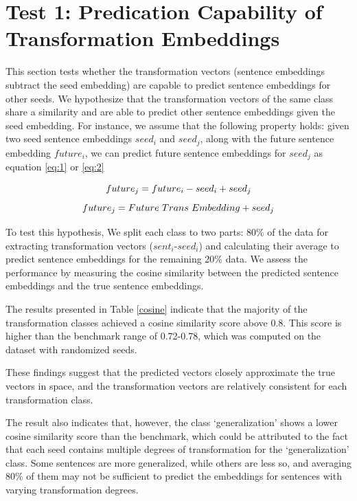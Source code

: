 \documentclass[11pt]{article}
\begin{document}
\section{Test 1: Predication Capability of Transformation Embeddings}\label{sec:cosine}

This section tests whether the transformation vectors (sentence embeddings subtract the seed embedding) are capable to predict sentence embeddings for other seeds. We hypothesize that the transformation vectors of the same class share a similarity and are able to predict other sentence embeddings given the seed embedding. For instance, we assume that the following property holds: given two seed sentence embeddings $seed_i$ and $seed_j$, along with the future sentence embedding $future_i$, we can predict future sentence embeddings for $seed_j$ as equation \ref{eq:1} or \ref{eq:2}

\begin{equation}
\label{eq:1}
\small{ future_j = future_i - seed_i + seed_j}
\end{equation}
\begin{equation}
\label{eq:2}
 \small{future_j = Future\ Trans\ Embedding + seed_j}
\end{equation}

To test this hypothesis, We split each class to two parts: 80\% of the data for extracting transformation vectors ($sent_i$-$seed_i$) and calculating their average to predict sentence embeddings for the remaining 20\% data. We assess the performance by measuring the cosine similarity between the predicted sentence embeddings and the true sentence embeddings.


The results presented in Table \ref{cosine} indicate that the majority of the transformation classes achieved a cosine similarity score above 0.8. This score is higher than the benchmark range of 0.72-0.78, which was computed on the dataset with randomized seeds. 

These findings suggest that the predicted vectors closely approximate the true vectors in space, and the transformation vectors are relatively consistent for each transformation class.

The result also indicates that, however, the class `generalization' shows a lower cosine similarity score than the benchmark, which could be attributed to the fact that each seed contains multiple degrees of transformation for the `generalization' class. Some sentences are more generalized, while others are less so, and averaging 80\% of them may not be sufficient to predict the embeddings for sentences with varying transformation degrees.
\end{document}
